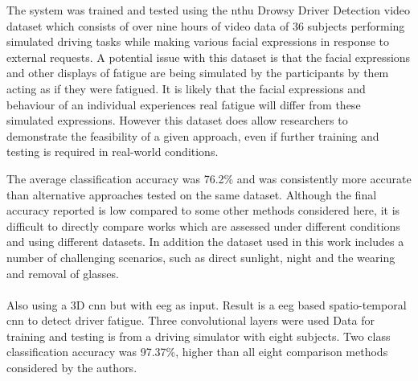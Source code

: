 \documentclass[11pt, parskip=half*,twoside=false]{scrbook}
\begin{document}
The system was trained and tested using the \gls{nthu} Drowsy Driver Detection video dataset \citep{wengDriverDrowsinessDetection2017} which consists of over nine hours of video data of 36 subjects performing simulated driving tasks while making various facial expressions in response to external requests. A potential issue with this dataset is that the facial expressions and other displays of fatigue are being simulated by the participants by them acting as if they were fatigued. It is likely that the facial expressions and behaviour of an individual experiences real fatigue will differ from these simulated expressions. However this dataset does allow researchers to demonstrate the feasibility of a given approach, even if further training and testing is required in real-world conditions.

The average classification accuracy was 76.2\% and was consistently more accurate than alternative approaches tested on the same dataset. Although the final accuracy reported is low compared to some other methods considered here, it is difficult to directly compare works which are assessed under different conditions and using different datasets. In addition the dataset used in this work includes a number of challenging scenarios, such as direct sunlight, night and the wearing and removal of glasses.

\paragraph{\citet{gaoEEGBasedSpatioTemporal2019}} Also using a 3D \gls{cnn} but with \gls{eeg} as input. Result is a \gls{eeg} based spatio-temporal \gls{cnn} to detect driver fatigue. Three convolutional layers were used Data for training and testing is from a driving simulator with eight subjects. Two class classification accuracy was 97.37\%, higher than all eight comparison methods considered by the authors.
\end{document}
